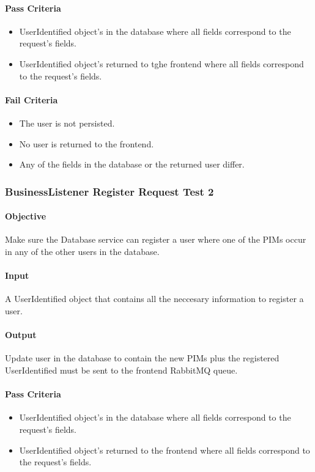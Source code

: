 \documentclass[hidelinks,english]{article}
\begin{document}
				\paragraph{Pass Criteria}
				\begin{itemize}
					\item UserIdentified object's in the database where all fields correspond to the request's fields.
					\item UserIdentified object's returned to tghe frontend where all fields correspond to the request's fields.
				\end{itemize}
				\paragraph{Fail Criteria}
				\begin{itemize}
					\item The user is not persisted.
					\item No user is returned to the frontend.
					\item Any of the fields in the database or the returned user differ.
				\end{itemize}
				
			\subsubsection{BusinessListener Register Request Test 2}\label{databasebusinesslistenerregistertest2}
				\paragraph{Objective} Make sure the Database service can register a user where one of the PIMs occur in any of the other users in the database.
				\paragraph{Input} A UserIdentified object that contains all the neccesary information to register a user.
				\paragraph{Output} Update user in the database to contain the new PIMs plus the registered UserIdentified must be sent to the frontend RabbitMQ queue.
				\paragraph{Pass Criteria}
				\begin{itemize}
					\item UserIdentified object's in the database where all fields correspond to the request's fields.
					\item UserIdentified object's returned to the frontend where all fields correspond to the request's fields.
				\end{itemize}
\end{document}
